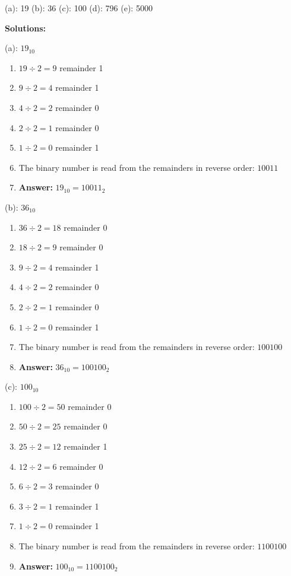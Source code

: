 \documentclass{article}
\begin{document}
\vspace*{0.25cm}
(a): 19 (b): 36 (c): 100 (d): 796 (e): 5000

\vspace*{0.5cm}

\noindent \textbf{Solutions:}

\vspace*{0.25cm}

\noindent (a): $19_{10}$

\begin{enumerate}
    \item $19 \div 2 = 9$ remainder 1
    \item $9 \div 2 = 4$ remainder 1
    \item $4 \div 2 = 2$ remainder 0
    \item $2 \div 2 = 1$ remainder 0
    \item $1 \div 2 = 0$ remainder 1
    \item The binary number is read from the remainders in reverse order: $10011$
    \item \textbf{Answer:} $19_{10} = 10011_2$
\end{enumerate}

\vspace*{0.5cm}

\noindent (b): $36_{10}$

\begin{enumerate}
    \item $36 \div 2 = 18$ remainder 0
    \item $18 \div 2 = 9$ remainder 0
    \item $9 \div 2 = 4$ remainder 1
    \item $4 \div 2 = 2$ remainder 0
    \item $2 \div 2 = 1$ remainder 0
    \item $1 \div 2 = 0$ remainder 1
    \item The binary number is read from the remainders in reverse order: $100100$
    \item \textbf{Answer:} $36_{10} = 100100_2$
\end{enumerate}

\vspace*{0.5cm}

\noindent (c): $100_{10}$

\begin{enumerate}
    \item $100 \div 2 = 50$ remainder 0
    \item $50 \div 2 = 25$ remainder 0
    \item $25 \div 2 = 12$ remainder 1
    \item $12 \div 2 = 6$ remainder 0
    \item $6 \div 2 = 3$ remainder 0
    \item $3 \div 2 = 1$ remainder 1
    \item $1 \div 2 = 0$ remainder 1
    \item The binary number is read from the remainders in reverse order: $1100100$
    \item \textbf{Answer:} $100_{10} = 1100100_2$
\end{enumerate}
\end{document}
